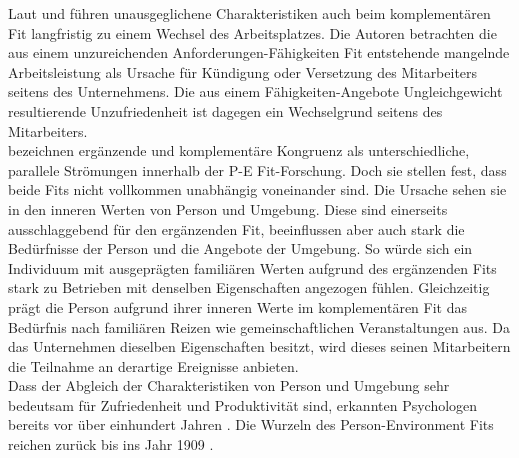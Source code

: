 Laut \textcite[S. 9ff.]{workAdjustment:1964} und \textcite{wanous:1992} führen unausgeglichene Charakteristiken auch beim komplementären Fit langfristig zu einem Wechsel des Arbeitsplatzes. Die Autoren betrachten die aus einem unzureichenden Anforderungen-Fähigkeiten Fit entstehende mangelnde Arbeitsleistung als Ursache für Kündigung oder Versetzung des Mitarbeiters seitens des Unternehmens. Die aus einem Fähigkeiten-Angebote Ungleichgewicht resultierende Unzufriedenheit ist dagegen ein Wechselgrund seitens des Mitarbeiters.\\
\textcite[S. 1ff.]{edwards:2004} bezeichnen ergänzende und komplementäre Kongruenz als unterschiedliche, parallele Strömungen innerhalb der P-E Fit-Forschung. Doch sie stellen fest, dass beide Fits nicht vollkommen unabhängig voneinander sind. Die Ursache sehen sie in den inneren Werten von Person und Umgebung. Diese sind einerseits ausschlaggebend für den ergänzenden Fit, beeinflussen aber auch stark die Bedürfnisse der Person und die Angebote der Umgebung. So würde sich ein Individuum mit ausgeprägten familiären Werten aufgrund des ergänzenden Fits stark zu Betrieben mit denselben Eigenschaften angezogen fühlen. Gleichzeitig prägt die Person aufgrund ihrer inneren Werte im komplementären Fit das Bedürfnis nach familiären Reizen wie gemeinschaftlichen Veranstaltungen aus. Da das Unternehmen dieselben Eigenschaften besitzt, wird dieses seinen Mitarbeitern die Teilnahme an derartige Ereignisse anbieten.\\
Dass der Abgleich der Charakteristiken von Person und Umgebung sehr bedeutsam für Zufriedenheit und Produktivität sind, erkannten Psychologen bereits vor über einhundert Jahren \cite[S. 5ff.]{parsons:1909}. Die Wurzeln des Person-Environment Fits reichen zurück bis ins Jahr 1909 \cite[S. 1]{su:2015}.

